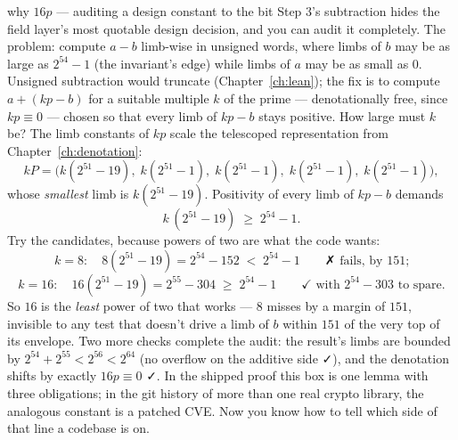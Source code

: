 \begin{worked}{why $16p$ --- auditing a design constant to the bit}
Step 3's subtraction hides the field layer's most quotable design
decision, and you can audit it completely. The problem: compute $a - b$
limb-wise in unsigned words, where limbs of $b$ may be as large as
$2^{54} - 1$ (the invariant's edge) while limbs of $a$ may be as small as
$0$. Unsigned subtraction would truncate (Chapter~\ref{ch:lean}); the fix
is to compute $a + (kp - b)$ for a suitable multiple $k$ of the prime ---
denotationally free, since $kp \equiv 0$ --- chosen so that every limb of
$kp - b$ stays positive. How large must $k$ be? The limb constants of
$kp$ scale the telescoped representation from Chapter~\ref{ch:denotation}:
\[
kP = \big(k(2^{51}-19),\; k(2^{51}-1),\; k(2^{51}-1),\; k(2^{51}-1),\;
k(2^{51}-1)\big),
\]
whose \emph{smallest} limb is $k(2^{51} - 19)$. Positivity of every limb
of $kp - b$ demands
\[
k\,(2^{51} - 19) \;\ge\; 2^{54} - 1 .
\]
Try the candidates, because powers of two are what the code wants:
\[
k = 8:\quad 8(2^{51}-19) = 2^{54} - 152 \;<\; 2^{54} - 1
\qquad\text{✗ fails, by 151;}
\]
\[
k = 16:\quad 16(2^{51}-19) = 2^{55} - 304 \;\ge\; 2^{54} - 1
\qquad\text{✓ with } 2^{54} - 303 \text{ to spare.}
\]
So $16$ is the \emph{least} power of two that works --- $8$ misses by a
margin of $151$, invisible to any test that doesn't drive a limb of $b$
within $151$ of the very top of its envelope. Two more checks complete
the audit: the result's limbs are bounded by
$2^{54} + 2^{55} < 2^{56} < 2^{64}$ (no overflow on the additive side ✓),
and the denotation shifts by exactly $16p \equiv 0$ ✓. In the shipped
proof this box is one lemma with three  obligations; in the
git history of more than one real crypto library, the analogous constant
is a patched CVE. Now you know how to tell which side of that line a
codebase is on.
\end{worked}

